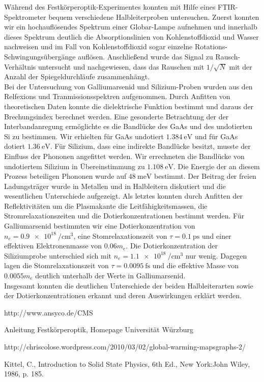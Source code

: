 \documentclass[paper=a4,fontsize=10pt,DIV=18,twocolumn,parskip=half]{scrartcl}
\numberwithin{equation}{section}    %
\begin{document}
Während des Festkörperoptik-Experimentes konnten mit Hilfe eines FTIR-Spektrometer bequem verschiedene Halbleiterproben untersuchen. Zuerst konnten wir ein hochauflösendes Spektrum einer Globar-Lampe aufnehmen und innerhalb dieses Spektrum deutlich die Absorptionslinien von Kohlenstoffdioxid und Wasser nachweisen und im Fall von Kohlenstoffdioxid sogar einzelne Rotations-Schwingungsübergänge auflösen.
Anschließend wurde das Signal zu Rausch-Verhältnis untersucht und nachgewiesen, dass das Rauschen mit $1/\sqrt{N}$ mit der Anzahl der Spiegeldurchläufe zusammenhängt.\\
Bei der Untersuchung von Galliumarsenid und Silizium-Proben wurden aus den Relfexions und Tranmissionsspektren aufgenommen. Durch Anfitten von theoretischen Daten konnte die dielektrische Funktion bestimmt und daraus der Brechungsindex berechnet werden.
Eine gesonderte Betrachtung der der Interbandanregung ermöglichte es die Bandlücke des  GaAs und des undotierten Si zu bestimmen. Wir erhielten für GaAs undotiert $\SI{1.384}{\eV}$ und für GaAs dotiert $\SI{1.36}{\eV}$. Für Silizium, dass eine indirekte Bandlücke besitzt, musste der Einfluss der Phononen angefittet werden. Wir errechneten die Bandlücke von undotiertem Silizium in Übereinstimmung zu $\SI{1.108}{\eV}$. Die Energie der an diesem Prozess beteiligen Phononen wurde auf $\SI{48}{\milli\eV}$ bestimmt. Der Beitrag der freien Ladungsträger wurde in Metallen und in Halbleitern diskutiert und die wesentlichen Unterschiede aufgezeigt. Als letztes konnten durch Anfitten der Reflektivitäten um die Plasmakante die Leitfähigkeitsmassen, die Stromrelaxationszeiten und die Dotierkonzentrationen bestimmt werden. Für Galliumarsenid bestimmten wir eine Dotierkonzentration von $n_e=\SI{0.9e18}{\per\centi\meter^3}$, eine Stomrelaxationszeit von $\tau=\SI{0.1}{\pico\second}$ und einer effektiven Elektronenmasse von $0.06m_e$. Die Dotierkonzentration der Siliziumprobe unterschied sich mit $n_e=\SI{1.1e18}{\per\centi\meter^3}$ nur wenig. Dagegen lagen die Stomrelaxationszeit von $\tau=\SI{0.0095}{\femto\second}$ und die effektive Masse von $0.0055m_e$ deutlich unterhalb der Werte in Galliumarsenid.\\
Insgesamt konnten die deutlichen Unterschiede der beiden Halbleiterarten sowie der Dotierkonzentrationen erkannt und deren Auswirkungen erklärt werden.
\begin{thebibliography}{}   

 http://www.ansyco.de/CMS

Anleitung Festkörperoptik, Homepage Universität Würzburg

http://chriscolose.wordpress.com/2010/03/02/global-warming-mapsgraphs-2/

 Kittel, C., Introduction to Solid State Physics, 6th Ed., New York:John Wiley, 1986, p. 185. 

\end{thebibliography}
\end{document}
